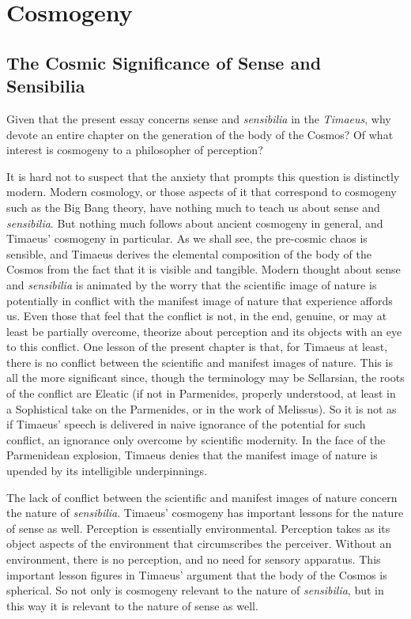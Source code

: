 \chapter{Cosmogeny} %
\label{cha:cosmogeny}

\section{The Cosmic Significance of Sense and Sensibilia} %
\label{sec:the_cosmic_significance_of_sensibilia}

Given that the present essay concerns sense and \emph{sensibilia} in the \emph{Timaeus}, why devote an entire chapter on the generation of the body of the Cosmos? Of what interest is cosmogeny to a philosopher of perception? 

It is hard not to suspect that the anxiety that prompts this question is distinctly modern. Modern cosmology, or those aspects of it that correspond to cosmogeny such as the Big Bang theory, have nothing much to teach us about sense and \emph{sensibilia}. But nothing much follows about ancient cosmogeny in general, and Timaeus' cosmogeny in particular. As we shall see, the pre-cosmic chaos is sensible, and Timaeus derives the elemental composition of the body of the Cosmos from the fact that it is visible and tangible. Modern thought about sense and \emph{sensibilia} is animated by the worry that the scientific image of nature is potentially in conflict with the manifest image of nature that experience affords us. Even those that feel that the conflict is not, in the end, genuine, or may at least be partially overcome, theorize about perception and its objects with an eye to this conflict. One lesson of the present chapter is that, for Timaeus at least, there is no conflict between the scientific and manifest images of nature. This is all the more significant since, though the terminology may be Sellarsian, the roots of the conflict are Eleatic (if not in Parmenides, properly understood, at least in a Sophistical take on the Parmenides, or in the work of Melissus). So it is not as if Timaeus' speech is delivered in naive ignorance of the potential for such conflict, an ignorance only overcome by scientific modernity. In the face of the Parmenidean explosion, Timaeus denies that the manifest image of nature is upended by its intelligible underpinnings. 

The lack of conflict between the scientific and manifest images of nature concern the nature of \emph{sensibilia}. Timaeus' cosmogeny has important lessons for the nature of sense as well. Perception is essentially environmental. Perception takes as its object aspects of the environment that circumscribes the perceiver. Without an environment, there is no perception, and no need for sensory apparatus. This important lesson figures in Timaeus' argument that the body of the Cosmos is spherical. So not only is cosmogeny relevant to the nature of \emph{sensibilia}, but in this way it is relevant to the nature of sense as well.

